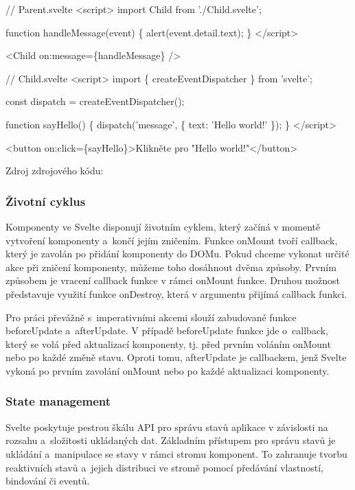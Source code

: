\begin{prog}
// Parent.svelte
<script>
  import Child from './Child.svelte';

  function handleMessage(event) \{
    alert(event.detail.text);
  \}
</script>

<Child on:message=\{handleMessage\} />

// Child.svelte
<script>
  import \{ createEventDispatcher \} from 'svelte';

  const dispatch = createEventDispatcher();

  function sayHello() \{
    dispatch('message', \{
      text: 'Hello world!'
    \});
  \}
</script>

<button on:click=\{sayHello\}>Klikněte pro "Hello world!"</button>
\end{prog}

Zdroj zdrojového kódu: \cite{svelte}

\subsubsection{Životní cyklus}

Komponenty ve Svelte disponují životním cyklem, který začíná v momentě vytvoření komponenty a~končí jejím zničením. 
Funkce onMount tvoří callback, který je zavolán po přidání komponenty do DOMu. Pokud chceme vykonat určité akce při zničení komponenty, můžeme toho dosáhnout dvěma způsoby. 
Prvním způsobem je vracení callback funkce v rámci onMount funkce. Druhou možnost představuje využití funkce onDestroy, která v argumentu přijímá callback funkci. 

Pro práci převážně s~imperativními akcemi slouží zabudované funkce beforeUpdate a~afterUpdate. 
V případě beforeUpdate funkce jde o~callback, který se volá před aktualizací komponenty, tj. před prvním voláním onMount nebo po každé změně stavu. 
Oproti tomu, afterUpdate je callbackem, jenž Svelte vykoná po prvním zavolání onMount nebo po každé aktualizaci komponenty.\cite{sveltehandbook,svelte}

\subsubsection{State management}

Svelte poskytuje pestrou škálu API pro správu stavů aplikace v závislosti na rozsahu a~složitosti ukládaných dat. 
Základním přístupem pro správu stavů je ukládání a~manipulace se stavy v rámci stromu komponent. 
To zahranuje tvorbu reaktivních stavů a~jejich distribuci ve stromě pomocí předávání vlastností, bindování či eventů. 

